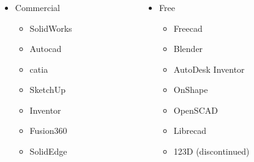 \documentclass[aspectratio=169]{beamer}
\begin{document}
\subsubsection{}
\begin{frame}
    \begin{columns}
        \hspace{0.1\textwidth}
        \begin{column}[t]{0.4\textwidth}
            \begin{itemize}
                \item Commercial
                      \begin{itemize}
                          \item SolidWorks
                          \item Auto\acs{cad}
                          \item \acs{catia}
                          \item SketchUp
                          \item Inventor
                          \item Fusion360
                          \item SolidEdge
                      \end{itemize}
            \end{itemize}
        \end{column}
        \begin{column}[t]{0.4\textwidth}
            \begin{itemize}
                \item Free
                      \begin{itemize}
                          \item Free\acs{cad}
                          \item Blender
                          \item \textcolor{tw-gray}{AutoDesk Inventor}
                          \item \textcolor{tw-gray}{OnShape}
                          \item OpenSCAD
                          \item Libre\acs{cad}
                          \item 123D (discontinued)
                      \end{itemize}
            \end{itemize}
        \end{column}
        \hspace{0.1\textwidth}
    \end{columns}
\end{frame}
\end{document}
